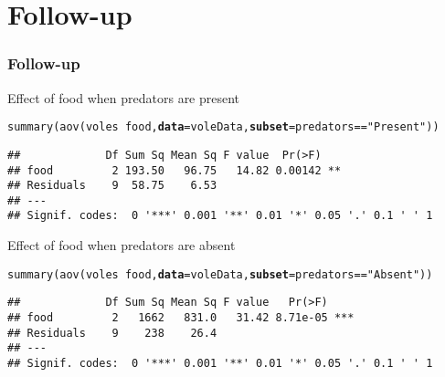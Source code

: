 \documentclass[color=usenames,dvipsnames]{beamer}\usepackage[]{graphicx}\usepackage[]{color}
\makeatletter
\newcommand{\hlstr}[1]{\textcolor[rgb]{0.749,0.012,0.012}{#1}}%
\newcommand{\hlopt}[1]{\textcolor[rgb]{0,0,0}{#1}}%
\newcommand{\hlstd}[1]{\textcolor[rgb]{0,0,0}{#1}}%
\newcommand{\hlkwc}[1]{\textcolor[rgb]{0,0,0}{\textbf{#1}}}%
\newcommand{\hlkwd}[1]{\textcolor[rgb]{0.004,0.004,0.506}{#1}}%
\newenvironment{kframe}{%
 \def\at@end@of@kframe{}%
 \ifinner\ifhmode%
  \def\at@end@of@kframe{\end{minipage}}%
  \begin{minipage}{\columnwidth}%
 \fi\fi%
 \def\FrameCommand##1{\hskip\@totalleftmargin \hskip-\fboxsep
 \colorbox{shadecolor}{##1}\hskip-\fboxsep
     \hskip-\linewidth \hskip-\@totalleftmargin \hskip\columnwidth}%
 \MakeFramed {\advance\hsize-\width
   \@totalleftmargin\z@ \linewidth\hsize
   \@setminipage}}%
 {\par\unskip\endMakeFramed%
 \at@end@of@kframe}
\newenvironment{knitrout}{}{} %
\makeatother
\begin{document}
\section{Follow-up}





\begin{frame}[fragile]
  \frametitle{Follow-up}
  \footnotesize
  Effect of food when predators are present
\begin{knitrout}\scriptsize
{}\color{fgcolor}\begin{kframe}
\begin{alltt}
\hlkwd{summary}\hlstd{(}\hlkwd{aov}\hlstd{(voles} \hlopt{~} \hlstd{food,} \hlkwc{data}\hlstd{=voleData,} \hlkwc{subset}\hlstd{=predators}\hlopt{==}\hlstr{"Present"}\hlstd{))}
\end{alltt}
\begin{verbatim}
##             Df Sum Sq Mean Sq F value  Pr(>F)   
## food         2 193.50   96.75   14.82 0.00142 **
## Residuals    9  58.75    6.53                   
## ---
## Signif. codes:  0 '***' 0.001 '**' 0.01 '*' 0.05 '.' 0.1 ' ' 1
\end{verbatim}
\end{kframe}
\end{knitrout}
\pause
\vfill
  Effect of food when predators are absent
\begin{knitrout}\scriptsize
{}\color{fgcolor}\begin{kframe}
\begin{alltt}
\hlkwd{summary}\hlstd{(}\hlkwd{aov}\hlstd{(voles} \hlopt{~} \hlstd{food,} \hlkwc{data}\hlstd{=voleData,} \hlkwc{subset}\hlstd{=predators}\hlopt{==}\hlstr{"Absent"}\hlstd{))}
\end{alltt}
\begin{verbatim}
##             Df Sum Sq Mean Sq F value   Pr(>F)    
## food         2   1662   831.0   31.42 8.71e-05 ***
## Residuals    9    238    26.4                     
## ---
## Signif. codes:  0 '***' 0.001 '**' 0.01 '*' 0.05 '.' 0.1 ' ' 1
\end{verbatim}
\end{kframe}
\end{knitrout}
\end{frame}
\end{document}
